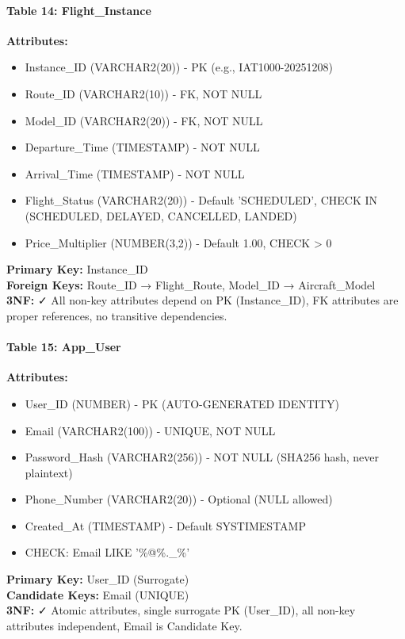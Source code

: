 \documentclass[12pt,a4paper,openany]{report}
\begin{document}
\paragraph{Table 14: Flight\_Instance}
\textbf{Attributes:} 
\begin{itemize}
    \item Instance\_ID (VARCHAR2(20)) - PK (e.g., IAT1000-20251208)
    \item Route\_ID (VARCHAR2(10)) - FK, NOT NULL
    \item Model\_ID (VARCHAR2(20)) - FK, NOT NULL
    \item Departure\_Time (TIMESTAMP) - NOT NULL
    \item Arrival\_Time (TIMESTAMP) - NOT NULL
    \item Flight\_Status (VARCHAR2(20)) - Default 'SCHEDULED', CHECK IN (SCHEDULED, DELAYED, CANCELLED, LANDED)
    \item Price\_Multiplier (NUMBER(3,2)) - Default 1.00, CHECK > 0
\end{itemize}
\textbf{Primary Key:} Instance\_ID\\
\textbf{Foreign Keys:} Route\_ID → Flight\_Route, Model\_ID → Aircraft\_Model\\
\textbf{3NF:} ✓ All non-key attributes depend on PK (Instance\_ID), FK attributes are proper references, no transitive dependencies.

\paragraph{Table 15: App\_User}
\textbf{Attributes:} 
\begin{itemize}
    \item User\_ID (NUMBER) - PK (AUTO-GENERATED IDENTITY)
    \item Email (VARCHAR2(100)) - UNIQUE, NOT NULL
    \item Password\_Hash (VARCHAR2(256)) - NOT NULL (SHA256 hash, never plaintext)
    \item Phone\_Number (VARCHAR2(20)) - Optional (NULL allowed)
    \item Created\_At (TIMESTAMP) - Default SYSTIMESTAMP
    \item CHECK: Email LIKE '\%@\%.\_\%'
\end{itemize}
\textbf{Primary Key:} User\_ID (Surrogate)\\
\textbf{Candidate Keys:} Email (UNIQUE)\\
\textbf{3NF:} ✓ Atomic attributes, single surrogate PK (User\_ID), all non-key attributes independent, Email is Candidate Key.
\end{document}
